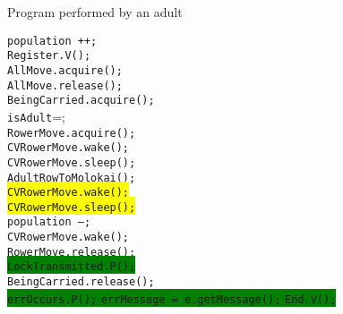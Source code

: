 \documentclass{article}
\begin{document}
\begin{spacing}{1.1}
\begin{algorithm}[bpth]
\caption{Program performed by an adult}
\begin{algorithmic}[1]
  \STATE \texttt{population ++;}\\
  \STATE \texttt{Register.V();}\\
  \STATE \texttt{AllMove.acquire();}\\
  \STATE \texttt{AllMove.release();}\\
  \STATE \texttt{BeingCarried.acquire();}\\
  \STATE \texttt{isAdult}=\TRUE;\\
  \STATE \texttt{RowerMove.acquire();}\\
  \STATE \texttt{CVRowerMove.wake();}\\
  \STATE \texttt{CVRowerMove.sleep();}\\
  \STATE \texttt{AdultRowToMolokai();}\\
  \STATE \colorbox{yellow}{\texttt{CVRowerMove.wake();}}\\
  \STATE \colorbox{yellow}{\texttt{CVRowerMove.sleep();}}\\
  \STATE \texttt{population --;}\\
  \STATE \texttt{CVRowerMove.wake();}\\
  \STATE \texttt{RowerMove.release();}\\
  \STATE \colorbox{green}{\texttt{LockTransmitted.P();}}\\
  \STATE \texttt{BeingCarried.release();}\\
  \vbox{\colorbox{green}{\vbox{
    \STATE \texttt{errOccurs.P();}
    \STATE \texttt{errMessage = e.getMessage();}
    \STATE \texttt{End.V();} 
    \ENDIF
  }}}
  \RETURN\\
\end{algorithmic}
\end{algorithm}



\end{spacing}
\end{document}
